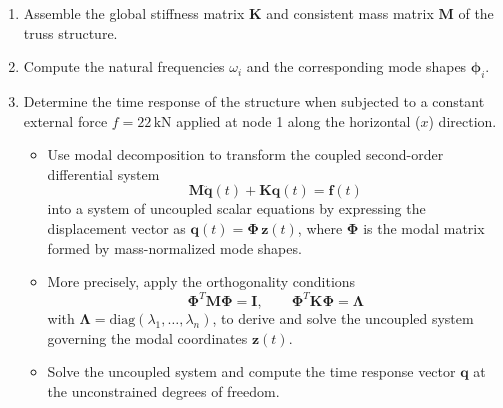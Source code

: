 \documentclass[12pt]{article}
\begin{document}
\begin{enumerate}
    \item Assemble the global stiffness matrix $\mathbf{K}$ and consistent mass matrix $\mathbf{M}$ of the truss structure.
    \item Compute the natural frequencies $\omega_i$ and the corresponding mode shapes $\boldsymbol{\phi}_i$.
    \item Determine the time response of the structure when subjected to a constant external force $f = 22 \, \text{kN}$ applied at node 1 along the horizontal ($x$) direction.
          \begin{itemize}
              \item[a)]Use modal decomposition to transform the coupled second-order differential system
                    \[
                        \mathbf{M} \ddot{\mathbf{q}}(t) + \mathbf{K} \mathbf{q}(t) = \mathbf{f}(t)
                    \]
                    into a system of uncoupled scalar equations by expressing the displacement vector as $\mathbf{q}(t) = \boldsymbol{\Phi} \, \mathbf{z}(t)$, where $\boldsymbol{\Phi}$ is the modal matrix formed by mass-normalized mode shapes.
              \item[b)]More precisely, apply the orthogonality conditions
                    \[
                        \boldsymbol{\Phi}^T \mathbf{M} \boldsymbol{\Phi} = \mathbf{I}, \qquad \boldsymbol{\Phi}^T \mathbf{K} \boldsymbol{\Phi} = \boldsymbol{\Lambda}
                    \]
                    with $\boldsymbol{\Lambda} = \text{diag}(\lambda_1, \dots, \lambda_n)$, to derive and solve the uncoupled system governing the modal coordinates $\mathbf{z}(t)$.
              \item[c)] Solve the uncoupled system and compute the time response vector $\mathbf{q}$ at the unconstrained degrees of freedom.
          \end{itemize}

\end{enumerate}
\end{document}
